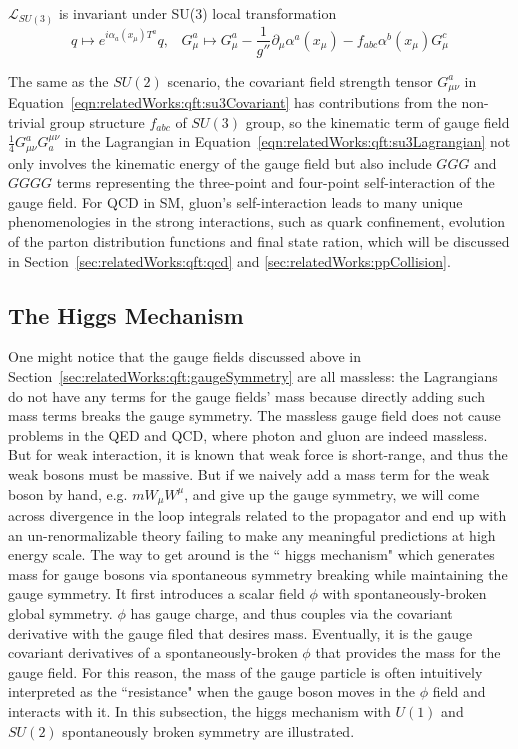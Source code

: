 \noindent $\mathcal{L}_{SU(3)}$ is invariant under SU(3) local transformation 
\begin{equation}
	q \longmapsto  e^{i\alpha_a (x_\mu) T^a} q , \;\;\; 
    G^a_\mu \longmapsto  G^a_\mu - \frac{1}{g''}\partial_\mu \alpha^a(x_\mu) - f_{abc}\alpha^b(x_\mu) G^c_\mu 
\end{equation}



\noindent The same as the $SU(2)$  scenario, the covariant field strength tensor $G^a_{\mu\nu}$ in Equation~\ref{eqn:relatedWorks:qft:su3Covariant}  has contributions from the non-trivial group structure $f_{abc}$ of $SU(3)$ group, so the kinematic term of gauge field $\frac{1}{4}G^a_{\mu\nu}G^{\mu\nu}_a$ in the Lagrangian in Equation~\ref{eqn:relatedWorks:qft:su3Lagrangian} not only involves the kinematic energy of the gauge field but also include $GGG$ and $GGGG$ terms representing the three-point and four-point self-interaction of the gauge field. For QCD in SM, gluon's self-interaction leads to many unique phenomenologies in the strong interactions, such as quark confinement, evolution of the parton distribution functions and final state ration, which will be discussed in Section~\ref{sec:relatedWorks:qft:qcd} and \ref{sec:relatedWorks:ppCollision}.





\subsection{The Higgs Mechanism}
\label{sec:relatedWorks:qft:higgsMechanism}
One might notice that the gauge fields discussed above in Section~\ref{sec:relatedWorks:qft:gaugeSymmetry} are all massless: the Lagrangians do not have any terms for the gauge fields' mass because directly adding such mass terms breaks the gauge symmetry. The massless gauge field does not cause problems in the QED and QCD, where photon and gluon are indeed massless. But for weak interaction, it is known that weak force is short-range, and thus the weak bosons must be massive. But if we naively add a mass term for the weak boson by hand, e.g. $m W_\mu W^\mu$, and give up the gauge symmetry, we will come across divergence in the loop integrals related to the propagator and end up with an un-renormalizable theory failing to make any meaningful predictions at high energy scale. The way to get around is the `` higgs mechanism" which generates mass for gauge bosons via spontaneous symmetry breaking while maintaining the gauge symmetry. It first introduces a scalar field $\phi$ with spontaneously-broken global symmetry. $\phi$ has gauge charge, and thus couples via the covariant derivative with the gauge filed that desires mass. Eventually, it is the gauge covariant derivatives of a spontaneously-broken $\phi$ that provides the mass for the gauge field. For this reason, the mass of the gauge particle is often intuitively interpreted as the ``resistance" when the gauge boson moves in the $\phi$ field and interacts with it. In this subsection, the higgs mechanism with $U(1)$ and $SU(2)$ spontaneously broken symmetry are illustrated.

